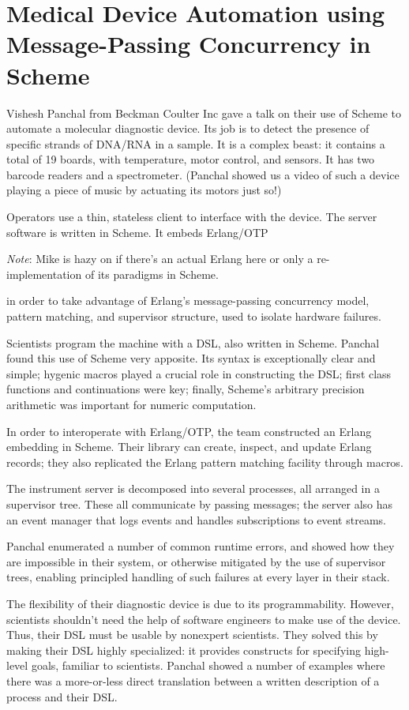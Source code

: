 \documentclass{jfp1}
\newenvironment{ipar}[0]%
 {\begin{list}{}%
 {\setlength{\leftmargin}{1cm}}%
\item[]%
 }
 {\end{list}}
\newcommand{\note}[1]{ \begin{ipar}  {\color{Gray} \textit{Note}: #1} \end{ipar}}
\begin{document}
\section{Medical Device Automation using Message-Passing 
Concurrency in Scheme}


Vishesh Panchal from Beckman Coulter Inc gave a talk on their use of
Scheme to automate a molecular diagnostic device. Its job is to
detect the presence of specific strands of DNA/RNA in a sample. It is
a complex beast: it contains a total of 19 boards, with temperature,
motor control, and sensors. It has two barcode readers and a
spectrometer. (Panchal showed us a video of such a device playing a
piece of music by actuating its motors just so!)

Operators use a thin, stateless client to interface with the device.
The server software is written in Scheme. It embeds Erlang/OTP
\note{Mike is hazy on if there's an actual Erlang here or only a
  re-implementation of its paradigms in Scheme.} in
order to take advantage of Erlang's message-passing concurrency
model, pattern matching, and supervisor structure, used to isolate
hardware failures.

Scientists program the machine with a DSL, also written in Scheme.
Panchal found this use of Scheme very apposite. Its syntax is
exceptionally clear and simple; hygenic macros played a crucial role
in constructing the DSL; first class functions and continuations were
key; finally, Scheme's arbitrary precision arithmetic was important
for numeric computation.

In order to interoperate with Erlang/OTP, the team constructed an
Erlang embedding in Scheme. Their library can create, inspect, and
update Erlang records; they also replicated the Erlang pattern
matching facility through macros.

The instrument server is decomposed into several processes, all
arranged in a supervisor tree. These all communicate by passing
messages; the server also has an event manager that logs events and
handles subscriptions to event streams.

Panchal enumerated a number of common runtime errors, and showed how
they are impossible in their system, or otherwise mitigated by the
use of supervisor trees, enabling principled handling of such
failures at every layer in their stack.

The flexibility of their diagnostic device is due to its
programmability. However, scientists shouldn't need the help of
software engineers to make use of the device. Thus, their DSL must be
usable by nonexpert scientists. They solved this by making their DSL
highly specialized: it provides constructs for specifying high-level
goals, familiar to scientists. Panchal showed a number of examples
where there was a more-or-less direct translation between a written
description of a process and their DSL.
\end{document}

